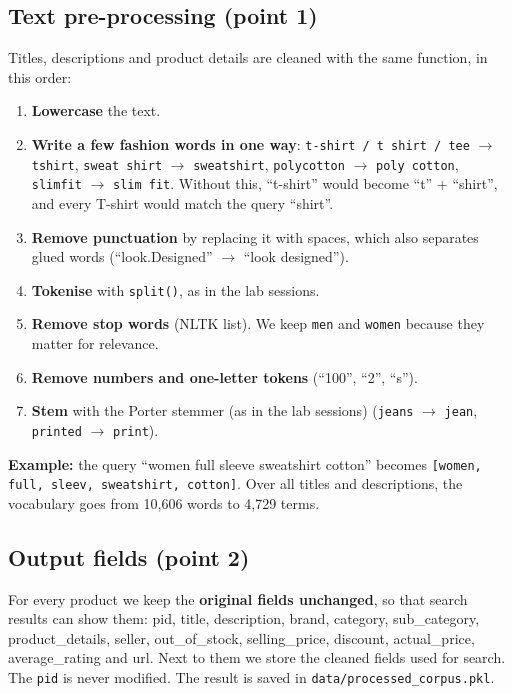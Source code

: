 \documentclass[11pt,a4paper]{article}
\begin{document}
\subsection{Text pre-processing (point 1)}
Titles, descriptions and product details are cleaned with the same function, in this order:
\begin{enumerate}
  \item \textbf{Lowercase} the text.
  \item \textbf{Write a few fashion words in one way}: \texttt{t-shirt / t shirt / tee} $\to$ \texttt{tshirt},
        \texttt{sweat shirt} $\to$ \texttt{sweatshirt}, \texttt{polycotton} $\to$ \texttt{poly cotton},
        \texttt{slimfit} $\to$ \texttt{slim fit}. Without this, ``t-shirt'' would become ``t'' + ``shirt'', and every
        T-shirt would match the query ``shirt''.
  \item \textbf{Remove punctuation} by replacing it with spaces, which also separates glued words
        (``look.Designed'' $\to$ ``look designed'').
  \item \textbf{Tokenise} with \texttt{split()}, as in the lab sessions.
  \item \textbf{Remove stop words} (NLTK list). We keep \texttt{men} and \texttt{women} because they matter for relevance.
  \item \textbf{Remove numbers and one-letter tokens} (``100'', ``2'', ``s'').
  \item \textbf{Stem} with the Porter stemmer (as in the lab sessions) (\texttt{jeans} $\to$ \texttt{jean}, \texttt{printed} $\to$ \texttt{print}).
\end{enumerate}
\textbf{Example:} the query ``women full sleeve sweatshirt cotton'' becomes
\texttt{[women, full, sleev, sweatshirt, cotton]}. Over all titles and descriptions, the vocabulary goes from 10,606
words to 4,729 terms.

\subsection{Output fields (point 2)}
For every product we keep the \textbf{original fields unchanged}, so that search results can show them:
pid, title, description, brand, category, sub\_category, product\_details, seller, out\_of\_stock, selling\_price,
discount, actual\_price, average\_rating and url. Next to them we store the cleaned fields used for search. The
\texttt{pid} is never modified. The result is saved in \texttt{data/processed\_corpus.pkl}.
\end{document}
